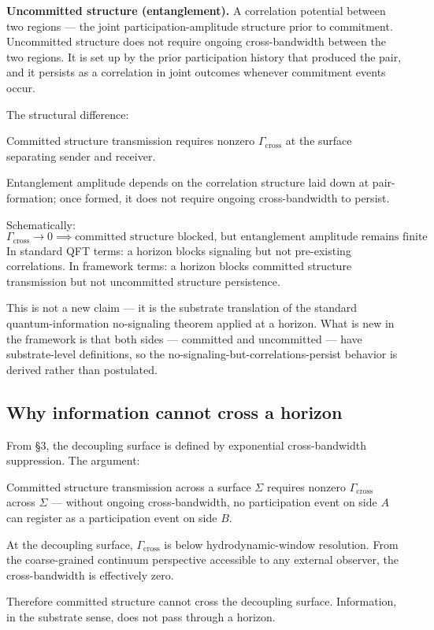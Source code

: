 \documentclass[11pt,a4paper]{article}
\begin{document}
\textbf{Uncommitted structure (entanglement).} A correlation potential between two regions --- the joint participation-amplitude structure prior to commitment. Uncommitted structure does not require ongoing cross-bandwidth between the two regions. It is set up by the prior participation history that produced the pair, and it persists as a correlation in joint outcomes whenever commitment events occur.

The structural difference:

Committed structure transmission requires nonzero $\Gamma_{\mathrm{cross}}$ at the surface separating sender and receiver.

Entanglement amplitude depends on the correlation structure laid down at pair-formation; once formed, it does not require ongoing cross-bandwidth to persist.

Schematically:
\[
\Gamma_{\mathrm{cross}} \to 0 \implies \text{committed structure blocked, but entanglement amplitude remains finite}
\]
In standard QFT terms: a horizon blocks signaling but not pre-existing correlations. In framework terms: a horizon blocks committed structure transmission but not uncommitted structure persistence.

This is not a new claim --- it is the substrate translation of the standard quantum-information no-signaling theorem applied at a horizon. What is new in the framework is that both sides --- committed and uncommitted --- have substrate-level definitions, so the no-signaling-but-correlations-persist behavior is derived rather than postulated.

\subsection{Why information cannot cross a horizon}

From \S3, the decoupling surface is defined by exponential cross-bandwidth suppression. The argument:

Committed structure transmission across a surface $\Sigma$ requires nonzero $\Gamma_{\mathrm{cross}}$ across $\Sigma$ --- without ongoing cross-bandwidth, no participation event on side $A$ can register as a participation event on side $B$.

At the decoupling surface, $\Gamma_{\mathrm{cross}}$ is below hydrodynamic-window resolution. From the coarse-grained continuum perspective accessible to any external observer, the cross-bandwidth is effectively zero.

Therefore committed structure cannot cross the decoupling surface. Information, in the substrate sense, does not pass through a horizon.
\end{document}
